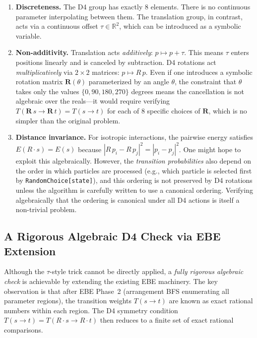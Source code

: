 \documentclass[12pt,a4paper]{article}
\theoremstyle{critical}
\theoremstyle{remark}
\begin{document}
\begin{enumerate}
\item \textbf{Discreteness.} The D4 group has exactly 8 elements. There is no continuous
  parameter interpolating between them. The translation group, in contrast, acts via a
  continuous offset $\tau \in \mathbb{R}^2$, which can be introduced as a symbolic
  variable.

\item \textbf{Non-additivity.} Translation acts \emph{additively}: $p \mapsto p + \tau$.
  This means $\tau$ enters positions linearly and is canceled by subtraction. D4
  rotations act \emph{multiplicatively} via $2\times 2$ matrices:
  $p \mapsto R\,p$. Even if one introduces a symbolic rotation matrix
  $\mathbf{R}(\theta)$ parameterized by an angle $\theta$, the constraint that $\theta$
  takes only the values $\{0, 90, 180, 270\}$ degrees means the cancellation is not
  algebraic over the reals---it would require verifying $T(\mathbf{R}\,s \to
  \mathbf{R}\,t) = T(s \to t)$ for each of 8 specific choices of $\mathbf{R}$, which is
  no simpler than the original problem.

\item \textbf{Distance invariance.} For isotropic interactions, the pairwise energy
  satisfies $E(R\cdot s) = E(s)$ because $|R\,p_i - R\,p_j|^2 = |p_i - p_j|^2$. One
  might hope to exploit this algebraically. However, the \emph{transition probabilities}
  also depend on the order in which particles are processed (e.g., which particle is
  selected first by \texttt{RandomChoice[state]}), and this ordering is not preserved by
  D4 rotations unless the algorithm is carefully written to use a canonical ordering.
  Verifying algebraically that the ordering is canonical under all D4 actions is itself
  a non-trivial problem.
\end{enumerate}

\subsection{A Rigorous Algebraic D4 Check via EBE Extension}

Although the $\tau$-style trick cannot be directly applied, a \emph{fully rigorous
algebraic check} is achievable by extending the existing EBE machinery. The key
observation is that after EBE Phase~2 (arrangement BFS enumerating all parameter
regions), the transition weights $T(s\to t)$ are known as exact rational numbers within
each region. The D4 symmetry condition $T(s\to t) = T(R\cdot s \to R\cdot t)$ then
reduces to a finite set of exact rational comparisons.
\end{document}
